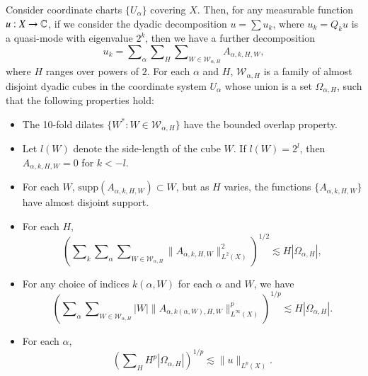 \begin{lemma} \label{atomicdecompositionlemma}
    Consider coordinate charts $\{ U_\alpha \}$ covering $X$. Then, for any measurable function $u: X \to \operatorname{\mathbb{C}}$, if we consider the dyadic decomposition $u = \sum u_k$, where $u_k = Q_k u$ is a quasi-mode with eigenvalue $2^k$, then we have a further decomposition
    \[ u_k = \sum\nolimits_\alpha \sum\nolimits_H \sum\nolimits_{W \in \mathcal{W}_{\alpha,H}} A_{\alpha,k,H,W}, \]
    where $H$ ranges over powers of $2$. For each $\alpha$ and $H$, $\mathcal{W}_{\alpha,H}$ is a family of almost disjoint dyadic cubes in the coordinate system $U_\alpha$ whose union is a set $\Omega_{\alpha,H}$, such that the following properties hold:
    \begin{itemize}
        \item The 10-fold dilates $\{ W^* : W \in \mathcal{W}_{\alpha,H} \}$ have the bounded overlap property.

        \item Let $l(W)$ denote the side-length of the cube $W$. If $l(W) = 2^l$, then $A_{\alpha,k,H,W} = 0$ for $k < -l$.

        \item For each $W$, $\text{supp}(A_{\alpha,k,H,W}) \subset W$, but as $H$ varies, the functions $\{ A_{\alpha,k,H,W} \}$ have almost disjoint support.

        \item For each $H$,
        \[ \left( \sum\nolimits_k \sum\nolimits_\alpha \sum\nolimits_{W \in \mathcal{W}_{\alpha,H}} \| A_{\alpha,k,H,W} \|_{L^2(X)}^2 \right)^{1/2} \lesssim H |\Omega_{\alpha,H}|, \]

        \item For any choice of indices $k(\alpha,W)$ for each $\alpha$ and $W$, we have
        \[ \left( \sum\nolimits_\alpha \sum\nolimits_{W \in \mathcal{W}_{\alpha,H}} |W| \| A_{\alpha,k(\alpha,W),H,W} \|_{L^\infty(X)}^p \right)^{1/p} \lesssim H |\Omega_{\alpha,H}|. \]

        \item For each $\alpha$,
        \[ \left( \sum\nolimits_H H^p |\Omega_{\alpha,H}| \right)^{1/p} \lesssim \| u \|_{L^p(X)}. \]
    \end{itemize}
\end{lemma}

